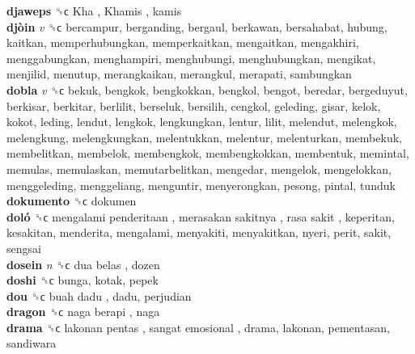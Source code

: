 \textbf{djaweps} ␝ϲ   Kha ,  Khamis , kamis  \\
\textbf{djòin} \emph{v}  ␝ϲ  bercampur, berganding, bergaul, berkawan, bersahabat, hubung, kaitkan, memperhubungkan, memperkaitkan, mengaitkan, mengakhiri, menggabungkan, menghampiri, menghubungi, menghubungkan, mengikat, menjilid, menutup, merangkaikan, merangkul, merapati, sambungkan  \\
\textbf{dobla} \emph{v}  ␝ϲ  bekuk, bengkok, bengkokkan, bengkol, bengot, beredar, bergeduyut, berkisar, berkitar, berlilit, berseluk, bersilih, cengkol, geleding, gisar, kelok, kokot, leding, lendut, lengkok, lengkungkan, lentur, lilit, melendut, melengkok, melengkung, melengkungkan, melentukkan, melentur, melenturkan, membekuk, membelitkan, membelok, membengkok, membengkokkan, membentuk, memintal, memulas, memulaskan, memutarbelitkan, mengedar, mengelok, mengelokkan, menggeleding, menggeliang, menguntir, menyerongkan, pesong, pintal, tunduk  \\
\textbf{dokumento} ␝ϲ  dokumen  \\
\textbf{doló} ␝ϲ   mengalami penderitaan ,  merasakan sakitnya ,  rasa sakit , keperitan, kesakitan, menderita, mengalami, menyakiti, menyakitkan, nyeri, perit, sakit, sengsai  \\
\textbf{dosein} \emph{n}  ␝ϲ   dua belas , dozen  \\
\textbf{doshi} ␝ϲ  bunga, kotak, pepek  \\
\textbf{dou} ␝ϲ   buah dadu , dadu, perjudian  \\
\textbf{dragon} ␝ϲ   naga berapi , naga  \\
\textbf{drama} ␝ϲ   lakonan pentas ,  sangat emosional , drama, lakonan, pementasan, sandiwara  \\
